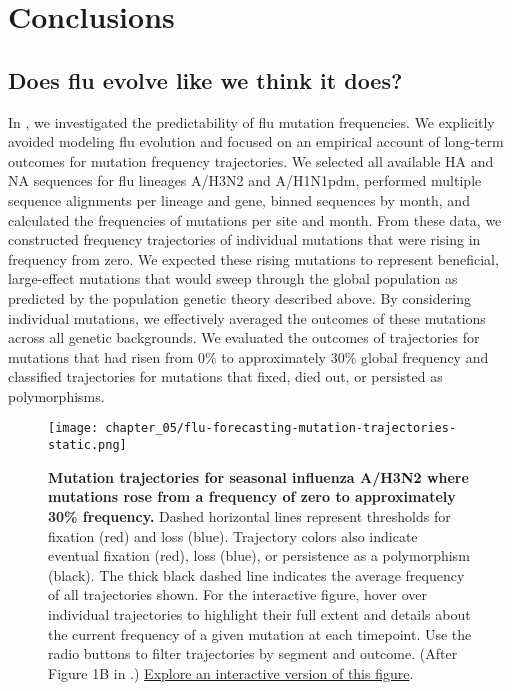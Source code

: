 \chapter{Conclusions}

\section{Does flu evolve like we think it does?}

In \citet{Barrat-Charlaix2020}, we investigated the predictability of flu mutation frequencies.
We explicitly avoided modeling flu evolution and focused on an empirical account of long-term outcomes for mutation frequency trajectories.
We selected all available HA and NA sequences for flu lineages A/H3N2 and A/H1N1pdm, performed multiple sequence alignments per lineage and gene, binned sequences by month, and calculated the frequencies of mutations per site and month.
From these data, we constructed frequency trajectories of individual mutations that were rising in frequency from zero.
We expected these rising mutations to represent beneficial, large-effect mutations that would sweep through the global population as predicted by the population genetic theory described above.
By considering individual mutations, we effectively averaged the outcomes of these mutations across all genetic backgrounds.
We evaluated the outcomes of trajectories for mutations that had risen from 0\% to approximately 30\% global frequency and classified trajectories for mutations that fixed, died out, or persisted as polymorphisms.

\begin{figure}
  \centering
  \texttt{[image: chapter\_05/flu-forecasting-mutation-trajectories-static.png]}
  \caption[{Mutation trajectories for seasonal influenza A/H3N2 where mutations rose from a frequency of zero to approximately 30\% frequency.}]{{\bf Mutation trajectories for seasonal influenza A/H3N2 where mutations rose from a frequency of zero to approximately 30\% frequency.}
    Dashed horizontal lines represent thresholds for fixation (red) and loss (blue).
    Trajectory colors also indicate eventual fixation (red), loss (blue), or persistence as a polymorphism (black).
    The thick black dashed line indicates the average frequency of all trajectories shown.
    For the interactive figure, hover over individual trajectories to highlight their full extent and details about the current frequency of a given mutation at each timepoint.
    Use the radio buttons to filter trajectories by segment and outcome.
    (After Figure 1B in \citet{Barrat-Charlaix2020}.)
    \href{https://bedford.io/blog/predicting-seasonal-influenza-evolution/\#mutation-trajectories}{Explore an interactive version of this figure}.\label{fig:mutation-trajectories} }
\end{figure}

